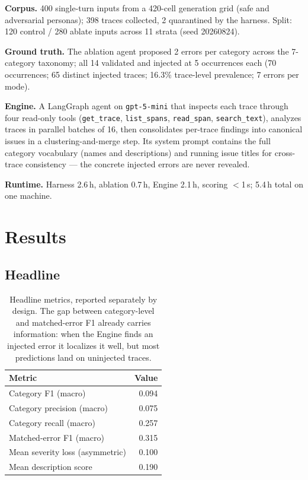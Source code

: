 \documentclass[11pt]{article}
\newcommand{\code}[1]{\texttt{#1}}
\begin{document}
\textbf{Corpus.} 400 single-turn inputs from a 420-cell generation grid (safe and adversarial personas); 398 traces collected, 2 quarantined by the harness. Split: 120 control / 280 ablate inputs across 11 strata (seed 20260824).

\textbf{Ground truth.} The ablation agent proposed 2 errors per category across the 7-category taxonomy; all 14 validated and injected at 5 occurrences each (70 occurrences; 65 distinct injected traces; 16.3\% trace-level prevalence; 7 errors per mode).

\textbf{Engine.} A LangGraph agent on \code{gpt-5-mini} that inspects each trace through four read-only tools (\code{get\_trace}, \code{list\_spans}, \code{read\_span}, \code{search\_text}), analyzes traces in parallel batches of 16, then consolidates per-trace findings into canonical issues in a clustering-and-merge step. Its system prompt contains the full category vocabulary (names and descriptions) and running issue titles for cross-trace consistency --- the concrete injected errors are never revealed.

\textbf{Runtime.} Harness 2.6\,h, ablation 0.7\,h, Engine 2.1\,h, scoring $<$1\,s; 5.4\,h total on one machine.

\section{Results}

\subsection{Headline}

\begin{table}[h]
\centering
\small
\begin{tabular}{lr}
\toprule
Metric & Value \\
\midrule
Category F1 (macro) & 0.094 \\
Category precision (macro) & 0.075 \\
Category recall (macro) & 0.257 \\
Matched-error F1 (macro) & 0.315 \\
Mean severity loss (asymmetric) & 0.100 \\
Mean description score & 0.190 \\
\bottomrule
\end{tabular}
\caption{Headline metrics, reported separately by design. The gap between category-level and matched-error F1 already carries information: when the Engine finds an injected error it localizes it well, but most predictions land on uninjected traces.}
\end{table}
\end{document}
